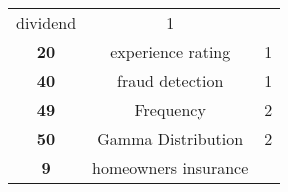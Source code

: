 \documentclass[]{book}
\theoremstyle{definition}
\theoremstyle{definition}
\theoremstyle{definition}
\theoremstyle{remark}
\begin{document}
\begin{longtable}[]{@{}ccc@{}}
\begin{minipage}[t]{0.42\columnwidth}
dividend\strut
\end{minipage} & \begin{minipage}[t]{0.29\columnwidth}\centering\strut
1\strut
\end{minipage}\tabularnewline
\begin{minipage}[t]{0.11\columnwidth}\centering\strut
\textbf{20}\strut
\end{minipage} & \begin{minipage}[t]{0.42\columnwidth}\centering\strut
experience rating\strut
\end{minipage} & \begin{minipage}[t]{0.29\columnwidth}\centering\strut
1\strut
\end{minipage}\tabularnewline
\begin{minipage}[t]{0.11\columnwidth}\centering\strut
\textbf{40}\strut
\end{minipage} & \begin{minipage}[t]{0.42\columnwidth}\centering\strut
fraud detection\strut
\end{minipage} & \begin{minipage}[t]{0.29\columnwidth}\centering\strut
1\strut
\end{minipage}\tabularnewline
\begin{minipage}[t]{0.11\columnwidth}\centering\strut
\textbf{49}\strut
\end{minipage} & \begin{minipage}[t]{0.42\columnwidth}\centering\strut
Frequency\strut
\end{minipage} & \begin{minipage}[t]{0.29\columnwidth}\centering\strut
2\strut
\end{minipage}\tabularnewline
\begin{minipage}[t]{0.11\columnwidth}\centering\strut
\textbf{50}\strut
\end{minipage} & \begin{minipage}[t]{0.42\columnwidth}\centering\strut
Gamma Distribution\strut
\end{minipage} & \begin{minipage}[t]{0.29\columnwidth}\centering\strut
2\strut
\end{minipage}\tabularnewline
\begin{minipage}[t]{0.11\columnwidth}\centering\strut
\textbf{9}\strut
\end{minipage} & \begin{minipage}[t]{0.42\columnwidth}\centering\strut
homeowners insurance\strut
\end{minipage} & \begin{minipage}[t]{0.29\columnwidth}\centering\strut

\end{minipage}
\end{longtable}
\end{document}
